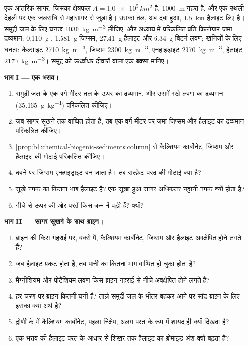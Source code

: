 \begin{problem}
\label{pb:b1:chemical-biogenic-sediments:1}
एक आंतरिक सागर, जिसका क्षेत्रफल $A = \qty{1.0e5}{km^2}$ है, \qty{1000}{m} गहरा है, और एक उथली देहली पर एक जलसंधि से महासागर से जुड़ा है। उसका तल, अब दबा हुआ, \qty{1.5}{km} हैलाइट लिए है। समुद्री जल के लिए घनत्व \qty{1030}{kg.m^{-3}} लीजिए, और अध्याय में परिकलित प्रति किलोग्राम जमा द्रव्यमान: \qty{0.110}{g} , \qty{1.581}{g} जिप्सम, \qty{27.41}{g} हैलाइट और \qty{6.34}{g} बिटर्न लवण; खनिजों के लिए घनत्व: कैल्साइट \qty{2710}{kg.m^{-3}}, जिप्सम \qty{2300}{kg.m^{-3}}, एनहाइड्राइट \qty{2970}{kg.m^{-3}}, हैलाइट \qty{2170}{kg.m^{-3}}। समुद्र को ऊर्ध्वाधर दीवारों वाला एक बक्सा मानिए।

\medskip
\noindent\textbf{भाग I --- एक भराव।}
\begin{enumerate}
  \item समुद्री जल के एक वर्ग मीटर तल के ऊपर का द्रव्यमान, और उसमें रखे लवण का द्रव्यमान (\qty{35.165}{g.kg^{-1}}) परिकलित कीजिए।
  \item जब सागर सूखने तक वाष्पित होता है, तब एक वर्ग मीटर पर जमा जिप्सम और हैलाइट का द्रव्यमान परिकलित कीजिए।
  \item \cref{prop:b1:chemical-biogenic-sediments:column} से कैल्शियम कार्बोनेट, जिप्सम और हैलाइट की मोटाई परिकलित कीजिए।
  \item दबने पर जिप्सम एनहाइड्राइट बन जाता है। तब सल्फ़ेट परत की मोटाई क्या है?
  \item सूखे नमक का कितना भाग हैलाइट है? एक सूखा हुआ सागर अधिकतर चट्टानी नमक क्यों होता है?
  \item नीचे से ऊपर की ओर परतें किस क्रम में पड़ी हैं? क्यों?
\end{enumerate}

\noindent\textbf{भाग II --- सागर सूखने के साथ ब्राइन।}
\begin{enumerate}[resume]
  \item ब्राइन की किस गहराई पर, बक्से में, कैल्शियम कार्बोनेट, जिप्सम और हैलाइट अवक्षेपित होने लगते हैं?
  \item जब हैलाइट प्रकट होता है, तब पानी का कितना भाग वाष्पित हो चुका होता है?
  \item मैग्नीशियम और पोटैशियम लवण किस ब्राइन-गहराई से नीचे अवक्षेपित होने लगते हैं?
  \item हर चरण पर ब्राइन कितनी घनी है? ताज़े समुद्री जल के भीतर बहकर आने पर सांद्र ब्राइन के लिए इसका क्या अर्थ है?
  \item द्रोणी के  में कैल्शियम कार्बोनेट, पहला निक्षेप, अलग परत के रूप में शायद ही क्यों दिखता है?
  \item एक भराव की हैलाइट परत के आधार से शिखर तक हैलाइट का ब्रोमाइड अंश क्यों बढ़ता है?
\end{enumerate}


\end{problem}
